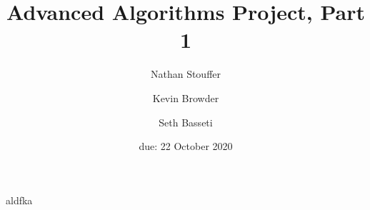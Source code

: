 \documentclass{article}
\title{Advanced Algorithms Project, Part 1}
\author{Nathan Stouffer \and Kevin Browder \and Seth Basseti}
\date{due: 22 October 2020}
\begin{document}
\maketitle

aldfka \cite{hu2005efficient}

\newpage


\end{document}
